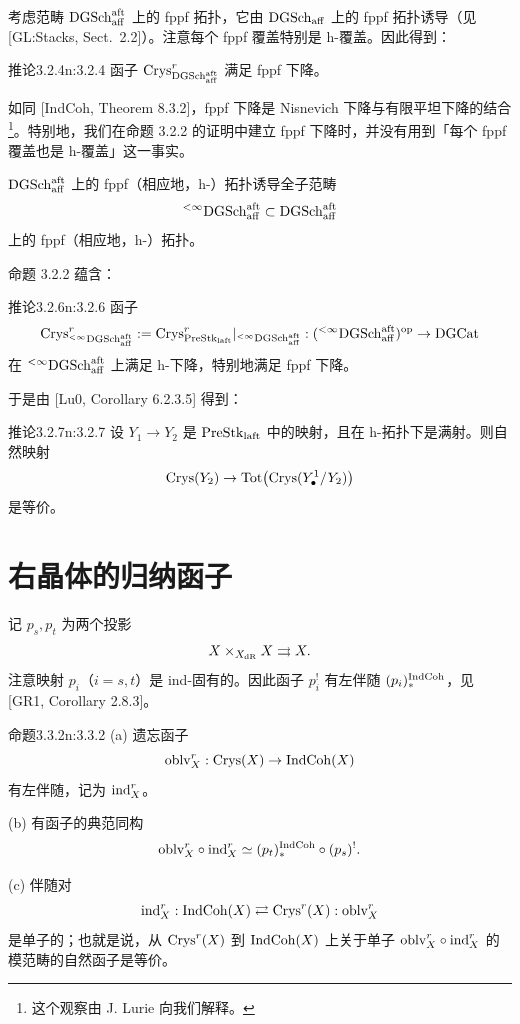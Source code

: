 考虑范畴 $\mathrm{DGSch}_{\mathrm{aff}}^{\mathrm{aft}}$ 上的 fppf 拓扑，它由 $\mathrm{DGSch}_{\mathrm{aff}}$ 上的 fppf 拓扑诱导（见 [GL:Stacks, Sect.~2.2]）。注意每个 fppf 覆盖特别是 h-覆盖。因此得到：

\begin{othm}{推论}{3.2.4}{n:3.2.4}
函子 $\mathrm{Crys}^r_{\mathrm{DGSch}_{\mathrm{aff}}^{\mathrm{aft}}}$ 满足 fppf 下降。
\end{othm}

如同 [IndCoh, Theorem 8.3.2]，fppf 下降是 Nisnevich 下降与有限平坦下降的结合\footnote{这个观察由 J. Lurie 向我们解释。}。特别地，我们在命题 3.2.2 的证明中建立 fppf 下降时，并没有用到「每个 fppf 覆盖也是 h-覆盖」这一事实。

$\mathrm{DGSch}_{\mathrm{aff}}^{\mathrm{aft}}$ 上的 fppf（相应地，h-）拓扑诱导全子范畴
\[
{}^{<\infty}\mathrm{DGSch}_{\mathrm{aff}}^{\mathrm{aft}}\subset\mathrm{DGSch}_{\mathrm{aff}}^{\mathrm{aft}}
\]
上的 fppf（相应地，h-）拓扑。

命题 3.2.2 蕴含：

\begin{othm}{推论}{3.2.6}{n:3.2.6}
函子
\[
\mathrm{Crys}^r_{{}^{<\infty}\mathrm{DGSch}_{\mathrm{aff}}^{\mathrm{aft}}}:=\mathrm{Crys}^r_{\mathrm{PreStk}_{\mathrm{laft}}}|_{{}^{<\infty}\mathrm{DGSch}_{\mathrm{aff}}^{\mathrm{aft}}}:({}^{<\infty}\mathrm{DGSch}_{\mathrm{aff}}^{\mathrm{aft}})^{\mathrm{op}}\to\mathrm{DGCat}
\]
在 ${}^{<\infty}\mathrm{DGSch}_{\mathrm{aff}}^{\mathrm{aft}}$ 上满足 h-下降，特别地满足 fppf 下降。
\end{othm}

于是由 [Lu0, Corollary 6.2.3.5] 得到：

\begin{othm}{推论}{3.2.7}{n:3.2.7}
设 $Y_1\to Y_2$ 是 $\mathrm{PreStk}_{\mathrm{laft}}$ 中的映射，且在 h-拓扑下是满射。则自然映射
\[
\mathrm{Crys}(Y_2)\to\mathrm{Tot}\big(\mathrm{Crys}(Y^1_\bullet/Y_2)\big)
\]
是等价。
\end{othm}

\section{右晶体的归纳函子}

记 $p_s,p_t$ 为两个投影
\[
X\times_{X_{\mathrm{dR}}}X\rightrightarrows X.
\]
注意映射 $p_i$（$i=s,t$）是 ind-固有的。因此函子 $p_i^!$ 有左伴随 $(p_i)_*^{\mathrm{IndCoh}}$，见 [GR1, Corollary 2.8.3]。

\begin{othm}{命题}{3.3.2}{n:3.3.2}
(a) 遗忘函子
\[
\mathrm{oblv}^r_X:\mathrm{Crys}(X)\to\mathrm{IndCoh}(X)
\]
有左伴随，记为 $\mathrm{ind}^r_X$。

(b) 有函子的典范同构
\[
\mathrm{oblv}^r_X\circ\mathrm{ind}^r_X\simeq(p_t)_*^{\mathrm{IndCoh}}\circ(p_s)^!.
\]

(c) 伴随对
\[
\mathrm{ind}^r_X:\mathrm{IndCoh}(X)\rightleftarrows\mathrm{Crys}^r(X):\mathrm{oblv}^r_X
\]
是单子的；也就是说，从 $\mathrm{Crys}^r(X)$ 到 $\mathrm{IndCoh}(X)$ 上关于单子 $\mathrm{oblv}^r_X\circ\mathrm{ind}^r_X$ 的模范畴的自然函子是等价。
\end{othm}

